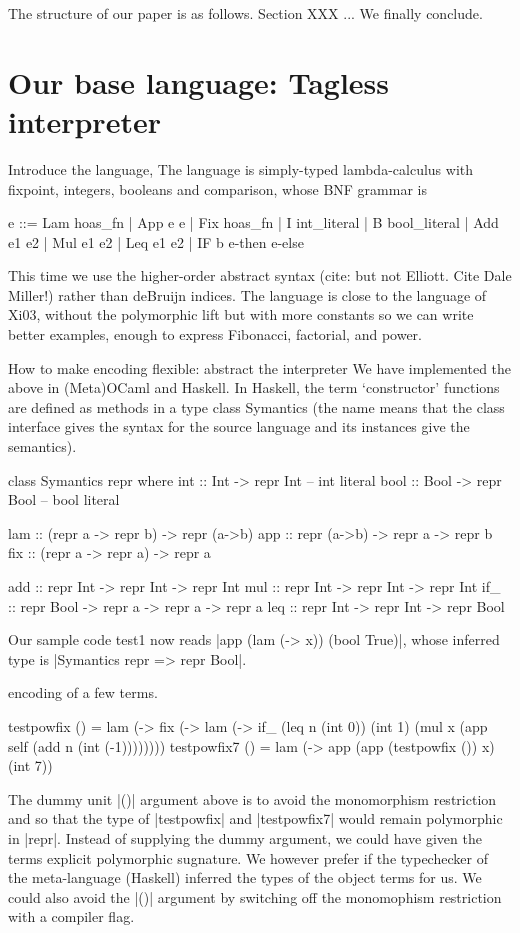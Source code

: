 \documentclass[preprint]{sigplanconf}
\begin{document}
The structure of our paper is as follows. Section XXX ...
We finally conclude.


\section{Our base language: Tagless interpreter}

Introduce the language, The language is simply-typed lambda-calculus
with fixpoint, integers, booleans and comparison, whose BNF grammar is

\begin{code}
  e ::= Lam hoas_fn | App e e | Fix hoas_fn |
  I int_literal | B bool_literal | Add e1 e2 | Mul e1 e2 | Leq e1 e2 |
  IF b e-then e-else
\end{code}

This time we use the higher-order abstract syntax (cite: but not
Elliott. Cite Dale Miller!) rather than deBruijn indices.  The
language is close to the language of Xi03, without the polymorphic
lift but with more constants so we can write better examples, enough to
express Fibonacci, factorial, and power.

How to make encoding flexible: abstract the interpreter
We have implemented the above in (Meta)OCaml and Haskell.  In Haskell,
the term `constructor' functions are defined as methods in a type class
Symantics (the name means that the class interface gives the syntax for
the source language and its instances give the semantics).



\begin{code}
class Symantics repr where
    int :: Int -> repr Int                -- int literal
    bool :: Bool -> repr Bool             -- bool literal

    lam :: (repr a -> repr b) -> repr (a->b)
    app :: repr (a->b) -> repr a -> repr b
    fix :: (repr a -> repr a) -> repr a

    add :: repr Int -> repr Int -> repr Int
    mul :: repr Int -> repr Int -> repr Int
    if_ :: repr Bool -> repr a -> repr a -> repr a
    leq :: repr Int -> repr Int -> repr Bool
\end{code}

Our sample code test1 now reads |app (lam (\x -> x)) (bool True)|,
whose inferred type is |Symantics repr => repr Bool|.

encoding of a few terms.

\begin{code}
testpowfix () = 
  lam (\x -> fix (\self -> lam (\n ->
        if_ (leq n (int 0)) (int 1)
            (mul x (app self (add n (int (-1))))))))
testpowfix7 () = 
  lam (\x -> app (app (testpowfix ()) x) (int 7))
\end{code}
The dummy unit |()| argument above is to avoid the monomorphism
restriction and so that the type of |testpowfix| and |testpowfix7|
would remain polymorphic in |repr|. Instead of supplying the dummy
argument, we could have given the terms explicit polymorphic
sugnature. We however prefer if the typechecker of the meta-language
(Haskell) inferred the types of the object terms for us. We could also
avoid the |()| argument by switching off the monomophism restriction
with a compiler flag.
\end{document}
